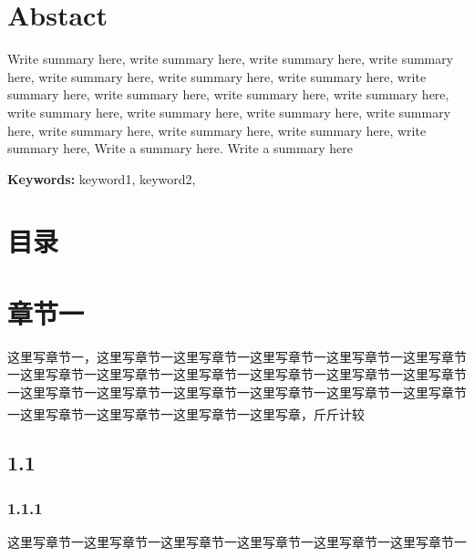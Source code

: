 \documentclass[UTF8,12pt,a4paper]{ctexart}
\newcommand{\upcite}[1]{\textsuperscript{\cite{#1}}}
\begin{document}
\section*{Abstact}
Write summary here, write summary here, write summary here, write summary here, write summary here, write summary here, write summary here, write summary here, write summary here, write summary here, write summary here, write summary here, write summary here, write summary here, write summary here, write summary here, write summary here, write summary here, write summary here, Write a summary here. Write a summary here
\par\textbf{Keywords:} keyword1, keyword2, 
\clearpage
{}
\thispagestyle{plain}
\section*{目录}
\vspace*{-6ex}
\renewcommand{\contentsname}{}
\begin{spacing}{1.1}
	\tableofcontents
\end{spacing}
\restoregeometry
\setcounter{page}{1}
\pagestyle{fancy}
\renewcommand{\headrulewidth}{0pt}
\fancyhead[L]{\textit{\leftmark}}
\fancyfoot[CO,CE]{\thepage}
\section{章节一}

这里写章节一，这里写章节一这里写章节一这里写章节一这里写章节一这里写章节一这里写章节一这里写章节一这里写章节一这里写章节一这里写章节一这里写章节一这里写章节一这里写章节一这里写章节一这里写章节一这里写章节一这里写章节一这里写章节一这里写章节一这里写章节一这里写章\upcite{karvelis2021transposonassociated,lucas2021impact,guomei2020jiyuhplcjiehehuaxuejiliangxueduihuangqinjingyezuijiacaishouqidepingjieyanjiu}，斤斤计较
\subsection{1.1}
\subsubsection{1.1.1}
这里写章节一这里写章节一这里写章节一这里写章节一这里写章节一这里写章节一
\end{document}
